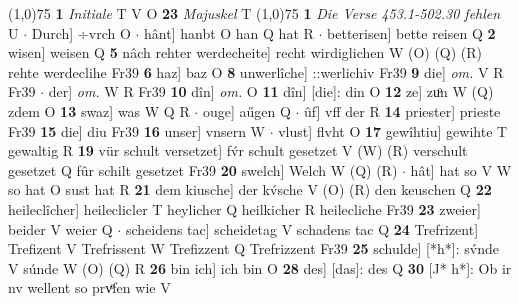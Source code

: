\documentclass[8pt,a4paper,notitlepage]{article}
\begin{document}
\begin{table}[ht]
\begin{minipage}[t]{0.5\linewidth}
\line(1,0){75} \newline
\textbf{1} \textit{Initiale} T V O  \textbf{23} \textit{Majuskel} T  \newline
\line(1,0){75} \newline
\textbf{1} \textit{Die Verse 453.1-502.30 fehlen} U   $\cdot$ Durch] ÷vrch O  $\cdot$ hânt] hanbt O han Q hat R  $\cdot$ betterisen] bette reisen Q \textbf{2} wisen] weisen Q \textbf{5} nâch rehter werdecheite] recht wirdiglichen W (O) (Q) (R) rehte werdeclihe Fr39 \textbf{6} haz] baz O \textbf{8} unwerlîche] ::werlichiv Fr39 \textbf{9} die] \textit{om.} V R Fr39  $\cdot$ der] \textit{om.} W R Fr39 \textbf{10} dîn] \textit{om.} O \textbf{11} dîn] [die]: din O \textbf{12} ze] zuͦn W (Q) zdem O \textbf{13} swaz] was W Q R  $\cdot$ ouge] aűgen Q  $\cdot$ ûf] vff der R \textbf{14} priester] prieste Fr39 \textbf{15} die] diu Fr39 \textbf{16} unser] vnsern W  $\cdot$ vlust] flvht O \textbf{17} gewîhtiu] gewihte T gewaltig R \textbf{19} vür schult versetzet] fv́r schult gesetzet V (W) (R) verschult gesetzet Q fûr schilt gesetzet Fr39 \textbf{20} swelch] Welch W (Q) (R)  $\cdot$ hât] hat so V W so hat O sust hat R \textbf{21} dem kiusche] der kv́sche V (O) (R) den keuschen Q \textbf{22} heileclîcher] heileclicler T heylicher Q heilkicher R heilecliche Fr39 \textbf{23} zweier] beider V weier Q  $\cdot$ scheidens tac] scheidetag V schadens tac Q \textbf{24} Trefrizent] Trefizent V Trefrissent W Trefizzent Q Trefrizzent Fr39 \textbf{25} schulde] [*h*]: sv́nde V súnde W (O) (Q) R \textbf{26} bin ich] ich bin O \textbf{28} des] [das]: des Q \textbf{30} [J* h*]: Ob ir nv wellent so prvͤfen wie V \newline
\end{minipage}
\end{table}
\end{document}
